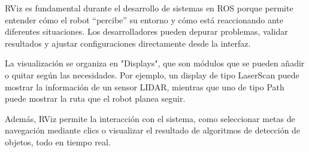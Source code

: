 RViz es fundamental durante el desarrollo de sistemas en ROS porque permite entender cómo el robot “percibe” su entorno y cómo está reaccionando ante diferentes situaciones. Los desarrolladores pueden depurar problemas, validar resultados y ajustar configuraciones directamente desde la interfaz.

La visualización se organiza en "Displays", que son módulos que se pueden añadir o quitar según las necesidades. Por ejemplo, un display de tipo LaserScan puede mostrar la información de un sensor LIDAR, mientras que uno de tipo Path puede mostrar la ruta que el robot planea seguir.

Además, RViz permite la interacción con el sistema, como seleccionar metas de navegación mediante clics o visualizar el resultado de algoritmos de detección de objetos, todo en tiempo real.

